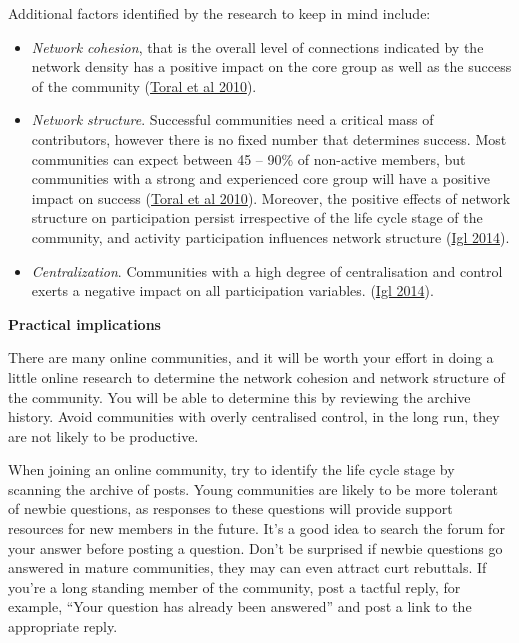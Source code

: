 \documentclass[
]{book}
\providecommand{\tightlist}{%
  \setlength{\itemsep}{0pt}\setlength{\parskip}{0pt}}
\theoremstyle{definition}
\theoremstyle{definition}
\theoremstyle{definition}
\theoremstyle{definition}
\theoremstyle{remark}
\begin{document}
Additional factors identified by the research to keep in mind include:

\begin{itemize}
\tightlist
\item
  \emph{Network cohesion}, that is the overall level of connections indicated by the network density has a positive impact on the core group as well as the success of the community (\href{https://twu.idm.oclc.org/login?url=https://search.ebscohost.com/login.aspx?direct=true\&db=edselp\&AN=S0950584909001888\&site=eds-live\&scope=site}{Toral et al 2010}).\\
\item
  \emph{Network structure}. Successful communities need a critical mass of contributors, however there is no fixed number that determines success. Most communities can expect between 45 -- 90\% of non-active members, but communities with a strong and experienced core group will have a positive impact on success (\href{https://twu.idm.oclc.org/login?url=https://search.ebscohost.com/login.aspx?direct=true\&db=edselp\&AN=S0950584909001888\&site=eds-live\&scope=site}{Toral et al 2010}). Moreover, the positive effects of network structure on participation persist irrespective of the life cycle stage of the community, and activity participation influences network structure (\href{https://mediatum.ub.tum.de/node?id=1218984}{Igl 2014}).\\
\item
  \emph{Centralization}. Communities with a high degree of centralisation and control exerts a negative impact on all participation variables. (\href{https://mediatum.ub.tum.de/node?id=1218984}{Igl 2014}).
\end{itemize}

\textbf{Practical implications}

There are many online communities, and it will be worth your effort in doing a little online research to determine the network cohesion and network structure of the community. You will be able to determine this by reviewing the archive history. Avoid communities with overly centralised control, in the long run, they are not likely to be productive.

When joining an online community, try to identify the life cycle stage by scanning the archive of posts. Young communities are likely to be more tolerant of newbie questions, as responses to these questions will provide support resources for new members in the future. It's a good idea to search the forum for your answer before posting a question. Don't be surprised if newbie questions go answered in mature communities, they may can even attract curt rebuttals. If you're a long standing member of the community, post a tactful reply, for example, ``Your question has already been answered'' and post a link to the appropriate reply.
\end{document}

